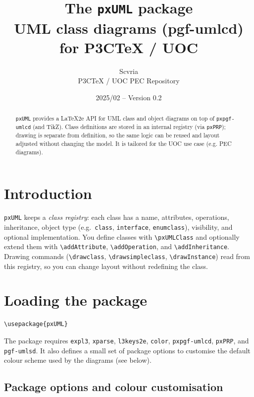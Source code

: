 \documentclass[11pt,a4paper]{article}
\title{The \texttt{pxUML} package\\
  \large UML class diagrams (pgf-umlcd) for P3CTeX / UOC}
\author{Scvria\\P3CTeX / UOC PEC Repository}
\date{2025/02 -- Version 0.2}
\begin{document}
\maketitle
\begin{abstract}
  \texttt{pxUML} provides a LaTeX2e API for UML class and object diagrams on top of
  \texttt{pxpgf-umlcd} (and TikZ). Class definitions are stored in an internal
  registry (via \texttt{pxPRP}); drawing is separate from definition, so the
  same logic can be reused and layout adjusted without changing the model. It is
  tailored for the UOC use case (e.g. PEC diagrams).
\end{abstract}
\tableofcontents

\section{Introduction}
\label{sec:intro}

\texttt{pxUML} keeps a \emph{class registry}: each class has a name, attributes,
operations, inheritance, object type (e.g.\ \texttt{class}, \texttt{interface},
\texttt{enumclass}), visibility, and optional implementation. You define classes
with \texttt{\textbackslash pxUMLClass} and optionally extend them with
\texttt{\textbackslash addAttribute}, \texttt{\textbackslash addOperation}, and
\texttt{\textbackslash addInheritance}. Drawing commands (\texttt{\textbackslash drawclass},
\texttt{\textbackslash drawsimpleclass}, \texttt{\textbackslash drawInstance}) read from
this registry, so you can change layout without redefining the class.

\section{Loading the package}
\label{sec:loading}

\begin{verbatim}
\usepackage{pxUML}
\end{verbatim}

The package requires \texttt{expl3}, \texttt{xparse}, \texttt{l3keys2e},
\texttt{color}, \texttt{pxpgf-umlcd}, \texttt{pxPRP}, and \texttt{pgf-umlsd}.
It also defines a small set of package options to customise the default
colour scheme used by the diagrams (see below).

\subsection*{Package options and colour customisation}
\end{document}
